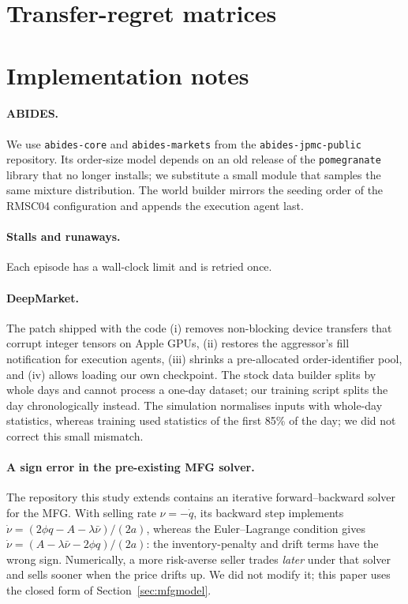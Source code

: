 \section{Transfer-regret matrices}
\label{app:regret}





\section{Implementation notes}
\label{app:impl}

\paragraph{ABIDES.} We use \texttt{abides-core} and \texttt{abides-markets} from the \texttt{abides-jpmc-public} repository. Its order-size model depends on an old release of the \texttt{pomegranate} library that no longer installs; we substitute a small module that samples the same mixture distribution. The world builder mirrors the seeding order of the RMSC04 configuration and appends the execution agent last.

\paragraph{Stalls and runaways.} Each episode has a wall-clock limit and is retried once. \runawayText{}

\paragraph{DeepMarket.} The patch shipped with the code (i) removes non-blocking device transfers that corrupt integer tensors on Apple GPUs, (ii) restores the aggressor's fill notification for execution agents, (iii) shrinks a pre-allocated order-identifier pool, and (iv) allows loading our own checkpoint. The stock data builder splits by whole days and cannot process a one-day dataset; our training script splits the day chronologically instead. The simulation normalises inputs with whole-day statistics, whereas training used statistics of the first 85\% of the day; we did not correct this small mismatch.

\paragraph{A sign error in the pre-existing MFG solver.} The repository this study extends contains an iterative forward--backward solver for the MFG. With selling rate $\nu=-\dot q$, its backward step implements $\dot\nu = (2\phi q - A - \lambda\bar\nu)/(2a)$, whereas the Euler--Lagrange condition gives $\dot\nu = (A - \lambda\bar\nu - 2\phi q)/(2a)$: the inventory-penalty and drift terms have the wrong sign. Numerically, a more risk-averse seller trades \emph{later} under that solver and sells sooner when the price drifts up. We did not modify it; this paper uses the closed form of Section~\ref{sec:mfgmodel}.
